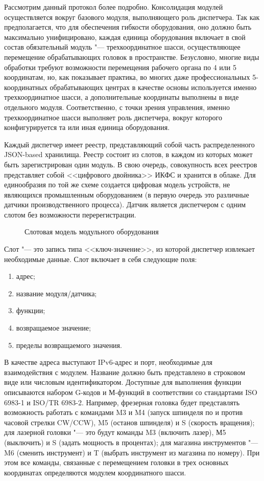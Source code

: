 Рассмотрим данный протокол более подробно. Консолидация модулей осуществляется вокруг базового модуля, выполняющего роль диспетчера. Так как предполагается, что для обеспечения гибкости оборудования, оно должно быть максимально унифицировано, каждая единица оборудования включает в свой состав обязательный модуль "--- трехкоординатное шасси, осуществляющее перемещение обрабатывающих головок в пространстве. Безусловно, многие виды обработки требуют возможности перемещения рабочего органа по 4 или 5 координатам, но, как показывает практика, во многих даже профессиональных 5-координатных обрабатывающих центрах в качестве основы используется именно трехкоординатное шасси, а дополнительные координаты выполнены в виде отдельного модуля. Соответственно, с точки зрения управления, именно трехкоординатное шасси выполняет роль диспетчера, вокруг которого конфигурируется та или иная единица оборудования. 

Каждый диспетчер имеет реестр, представляющий собой часть распределенного JSON-based хранилища. Реестр состоит из слотов, в каждом из которых может быть зарегистрирован один модуль. В свою очередь, совокупность всех реестров представляет собой <<цифрового двойника>> ИКФС и хранится в облаке. Для единообразия по той же схеме создается цифровая модель устройств, не являющихся промышленным оборудованием (в первую очередь это различные датчики производственного процесса). Датчик является диспетчером с одним слотом без возможности перерегистрации.

\begin{figure}[ht]
	\caption{Слотовая модель модульного оборудования}\label{fig:main-arch}
\end{figure}

Слот "--- это запись типа <<ключ-значение>>, из которой диспетчер извлекает необходимые данные. Слот включает в себя следующие поля:

\begin{enumerate}
	\item адрес;
	\item название модуля/датчика;
	\item функции;
	\item возвращаемое значение;
	\item пределы возвращаемого значения.
\end{enumerate}

В качестве адреса выступают IPv6-адрес и порт, необходимые для взаимодействия с модулем. Название должно быть представлено в строковом виде или числовым идентификатором. Доступные для выполнения функции описываются набором G-кодов и М-функций в соответствии со стандартами ISO 6983-1 и ISO/TR 6983-2.
Например, фрезерная головка будет представлять возможность работать с командами M3 и M4 (запуск шпинделя по и против часовой стрелки CW/CCW), M5 (останов шпинделя) и S (скорость вращения); для лазерной головки "--- это будут команды M3 (включить лазер), М5 (выключить) и S (задать мощность в процентах); для магазина инструментов "--- M6 (сменить инструмент) и T (выбрать инструмент из магазина по номеру).  При этом все команды, связанные с перемещением головки в трех основных координатах определяются модулем координатного шасси.

